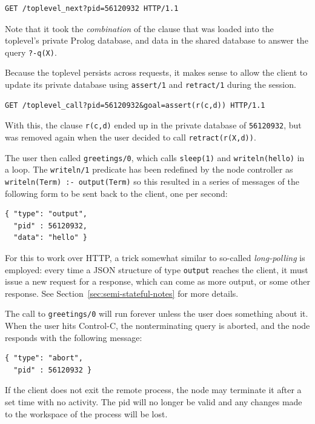 \begin{verbatim}
GET /toplevel_next?pid=56120932 HTTP/1.1
\end{verbatim}

\noindent Note that it took the \textit{combination} of the clause that was loaded into the toplevel's private Prolog database, and data in the shared database to answer the query \texttt{?-q(X)}.

Because the toplevel persists across requests, it makes sense to allow the client to update its private database using \texttt{assert/1} and \texttt{retract/1} during the session.

\begin{verbatim}
GET /toplevel_call?pid=56120932&goal=assert(r(c,d)) HTTP/1.1
\end{verbatim}

\noindent With this, the clause \texttt{r(c,d)} ended up in the private database of \texttt{56120932}, but was removed again when the user decided to call \texttt{retract(r(X,d))}.

The user then called \texttt{greetings/0}, which calls \texttt{sleep(1)} and \texttt{writeln(hello)} in a loop. The \texttt{writeln/1} predicate has been redefined by the node controller as \texttt{writeln(Term)\,:-\,output(Term)} so this resulted in a series of messages of the following form to be sent back to the client, one per second:

\begin{verbatim}
{ "type": "output",
  "pid" : 56120932,
  "data": "hello" }
\end{verbatim}

\noindent For this to work over HTTP, a trick somewhat similar to so-called \textit{long-polling} is employed: every time a JSON structure of type \texttt{output} reaches the client, it must issue a new request for a response, which can come as more output, or some other response. See Section~\ref{sec:semi-stateful-notes} for more details.

The call to \texttt{greetings/0} will run forever unless the user does something about it. When the user hits Control-C, the nonterminating query is aborted, and the node responds with the following message:

\begin{verbatim}
{ "type": "abort",
  "pid" : 56120932 }
\end{verbatim}

\noindent If the client does not exit the remote process, the node may terminate it after a set time with no activity. The pid will no longer be valid and any changes made to the workspace of the process will be lost. 


